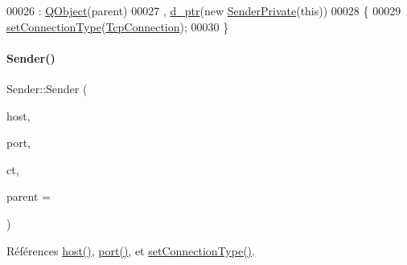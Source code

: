 \begin{DoxyCode}
00026                               : \hyperlink{class_q_object}{QObject}(parent)
00027   , \hyperlink{class_simple_mail_1_1_sender_a0616c34e23dc61b19e5f50f43000669b}{d\_ptr}(\textcolor{keyword}{new} \hyperlink{class_simple_mail_1_1_sender_private}{SenderPrivate}(\textcolor{keyword}{this}))
00028 \{
00029     \hyperlink{class_simple_mail_1_1_sender_a879bee44b1e7afed564c82b81261a9b1}{setConnectionType}(\hyperlink{class_simple_mail_1_1_sender_a89e6a9572b306441237f6b6635729d1aa7de3defa96cacca9817fbea9b9aecf56}{TcpConnection});
00030 \}
\end{DoxyCode}
\mbox{\label{class_simple_mail_1_1_sender_a120ee6620d9f22b5c008b27743d03a6d}} 
\paragraph{\texorpdfstring{Sender()}{Sender()}\hspace{0.1cm}{\footnotesize\ttfamily [2/2]}}
{\footnotesize\ttfamily Sender\+::\+Sender (\begin{DoxyParamCaption}\item[{const Q\+String \&}]{host,  }\item[{int}]{port,  }\item[{\hyperlink{class_simple_mail_1_1_sender_a89e6a9572b306441237f6b6635729d1a}{Connection\+Type}}]{ct,  }\item[{\hyperlink{class_q_object}{Q\+Object} $\ast$}]{parent = {} }\end{DoxyParamCaption})}



Références \hyperlink{class_simple_mail_1_1_sender_a688b0cf38532aa73fa943fa4a8d9f797}{host()}, \hyperlink{class_simple_mail_1_1_sender_a9c30e23e4b14333276af1a8b265ccb3c}{port()}, et \hyperlink{class_simple_mail_1_1_sender_a879bee44b1e7afed564c82b81261a9b1}{set\+Connection\+Type()}.


